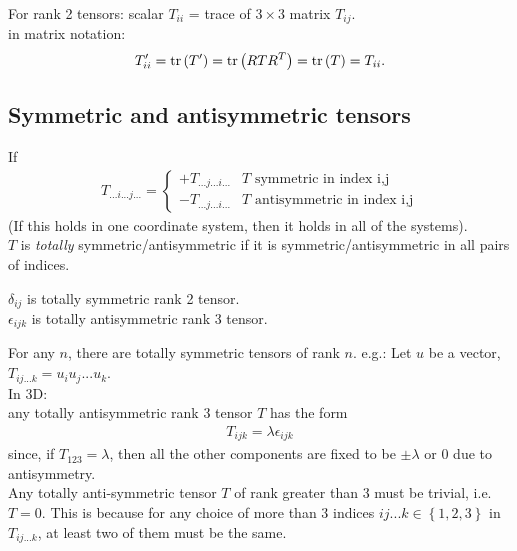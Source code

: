 \documentclass[a4paper]{article}
\begin{document}
\begin{eg}
For rank 2 tensors: scalar $T_{ii}$ = trace of $3\times 3$ matrix $T_{ij}$.\\
in matrix notation:
\begin{equation*}
\begin{aligned}
T'_{ii} = \operatorname{tr}\left(T'\right) = \operatorname{tr}\left(RTR^T\right) = \operatorname{tr}\left(T\right) = T_{ii}.
\end{aligned}
\end{equation*}
\end{eg}

\subsection{Symmetric and antisymmetric tensors}
If 
\begin{equation*}
\begin{aligned}
T_{...i...j...} = \left\{
\begin{array}{ll}
+T_{...j...i...} & T \text{  symmetric in index i,j}\\
-T_{...j...i...} & T \text{  antisymmetric in index i,j}
\end{array}
\right.
\end{aligned}
\end{equation*}
(If this holds in one coordinate system, then it holds in all of the systems).\\
$T$ is \emph{totally} symmetric/antisymmetric if it is symmetric/antisymmetric in all pairs of indices.\\

\begin{eg}
$\delta_{ij}$ is totally symmetric rank 2 tensor.\\
$\epsilon_{ijk}$ is totally antisymmetric rank 3 tensor.
\end{eg}

For any $n$, there are totally symmetric tensors of rank $n$. e.g.: Let $u$ be a vector, $T_{ij...k} = u_i u_j ... u_k$.\\
In 3D:\\
any totally antisymmetric rank 3 tensor $T$ has the form
\begin{equation*}
\begin{aligned}
T_{ijk} = \lambda \epsilon_{ijk}
\end{aligned}
\end{equation*}
since, if $T_{123} = \lambda$, then all the other components are fixed to be $\pm \lambda$ or 0 due to antisymmetry.\\
Any totally anti-symmetric tensor $T$ of rank greater than 3 must be trivial, i.e. $T=0$. This is because for any choice of more than 3 indices $ij...k \in \left\{1,2,3\right\}$ in $T_{ij...k}$, at least two of them must be the same.
\end{document}
